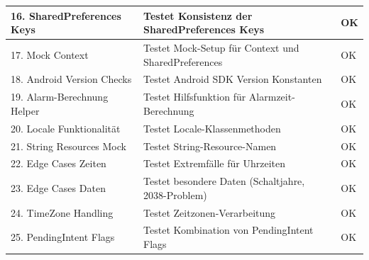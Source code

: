 \documentclass[a4paper,12pt]{article}
\begin{document}
\begin{tabularx}{\textwidth}{|l|X|l|}
\hline
16. SharedPreferences Keys & Testet Konsistenz der SharedPreferences Keys & OK \\
\hline
17. Mock Context & Testet Mock-Setup für Context und SharedPreferences & OK \\
\hline
18. Android Version Checks & Testet Android SDK Version Konstanten & OK \\
\hline
19. Alarm-Berechnung Helper & Testet Hilfsfunktion für Alarmzeit-Berechnung & OK \\
\hline
20. Locale Funktionalität & Testet Locale-Klassenmethoden & OK \\
\hline
21. String Resources Mock & Testet String-Resource-Namen & OK \\
\hline
22. Edge Cases Zeiten & Testet Extremfälle für Uhrzeiten & OK \\
\hline
23. Edge Cases Daten & Testet besondere Daten (Schaltjahre, 2038-Problem) & OK \\
\hline
24. TimeZone Handling & Testet Zeitzonen-Verarbeitung & OK \\
\hline
25. PendingIntent Flags & Testet Kombination von PendingIntent Flags & OK \\
\hline
\end{tabularx}
\end{document}
